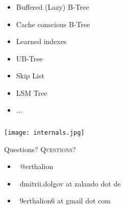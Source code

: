 \documentclass[usenames,dvipsnames, 18pt, compress, aspectratio=169]{beamer}
\def\twitter{{\FA \faTwitter}}
\def\email{{\FA \faEnvelope}}
\begin{document}
\begin{frame}[fragile]{}
    \frametitle{}

    \begin{center}
        \begin{itemize}[label={\MVRightarrow}]
            \item <+-> Buffered (Lazy) B-Tree
            \item <+-> Cache conscious B-Tree
            \item <+-> Learned indexes
            \item <+-> UB-Tree
            \item <+-> Skip List
            \item <+-> LSM Tree
            \item <+-> ...
        \end{itemize}
    \end{center}
\end{frame}

\begin{frame}[fragile]{}
    \frametitle{}

    \begin{center}
    \vspace{0.5cm}
    \texttt{[image: internals.jpg]}
    \end{center}
\end{frame}

\fontsize{18pt}{18}\selectfont
\begin{frame}
  \vspace*{2.5cm}
  \begin{minipage}[b][\paperheight]{\textwidth}
  \begin{center}

      \linespread{1.0}%
      \if@noSmallCapitals%
        Questions?
      \else%
        \scshape{\color{black} Questions?}%
      \fi%
      \vspace*{0.3em}

      \fontsize{13pt}{14}\selectfont
        \begin{itemize}[label={}]
            \item {\color{black} \twitter\ @erthalion}
            \item {\color{black} \email\ dmitrii.dolgov at zalando dot de}
            \item {\color{black} \email\ 9erthalion6 at gmail dot com}
        \end{itemize}
      \vspace*{2.5em}%

    \vfill
    \vspace*{2em}
  \end{center}
  \end{minipage}

\end{frame}
\end{document}
